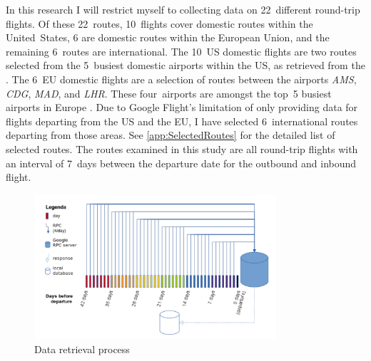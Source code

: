 In this research I will restrict myself to collecting data on 22~different round-trip flights. Of these 22~routes, 10~flights cover domestic routes within the United~States, 6 are domestic routes within the European Union, and the remaining 6~routes are international. The 10~US domestic flights are two routes selected from the 5~busiest domestic airports within the US, as retrieved from the . The 6~EU domestic flights are a selection of routes between the airports \emph{AMS}, \emph{CDG}, \emph{MAD}, and \emph{LHR}. These four~airports are amongst the top~5 busiest airports in Europe . Due to Google Flight's limitation of only providing data for flights departing from the US and the EU, I have selected 6~international routes departing from those areas. See \autoref{app:SelectedRoutes} for the detailed list of selected routes. The routes examined in this study are all round-trip flights with an interval of 7~days between the departure date for the outbound and inbound flight.

\begin{figure}
\centering
\includegraphics[width=0.8\textwidth]{figures/DataRetrievalProcess}
\caption{Data retrieval process}
\label{fig:DataRetrievalProcess}
\end{figure}

